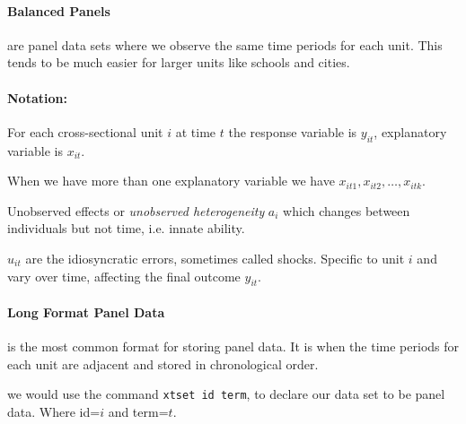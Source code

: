 \documentclass[11pt]{article}
\begin{document}
\paragraph{Balanced Panels} are panel data sets where we observe the same time periods for each unit. This tends to be much easier for larger units like schools and cities.

\begin{shaded}
    \paragraph{Notation:} \mbox{}

    For each cross-sectional unit $i$ at time $t$ the response variable is $y_{it}$, explanatory variable is $x_{it}$. 

    When we have more than one explanatory variable we have $x_{it1}, x_{it2}, \ldots, x_{itk}$.

    Unobserved effects or \textit{unobserved heterogeneity} $a_i$ which changes between individuals but not time, i.e. innate ability.

    $u_{it}$ are the idiosyncratic errors, sometimes called shocks. Specific to unit $i$ and vary over time, affecting the final outcome $y_{it}$.
\end{shaded}



\paragraph{Long Format Panel Data} is the most common format for storing panel data. It is when the time periods for each unit are adjacent and stored in chronological order. 
\begin{mdframed}
    we would use the command \lstinline{xtset id term}, to declare our data set to be panel data. Where id=$i$ and term=$t$.
\end{mdframed}
\end{document}
